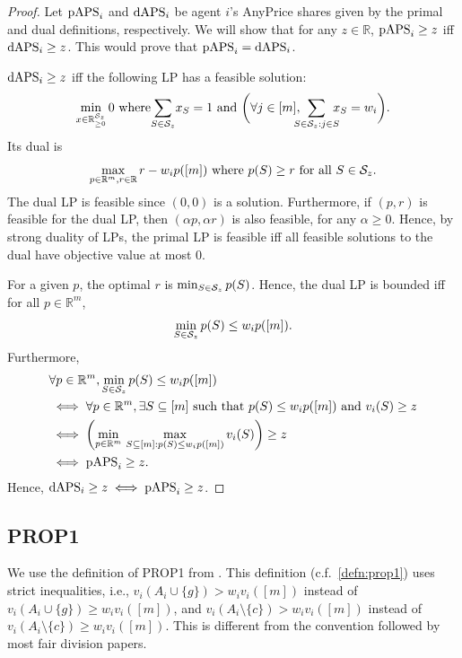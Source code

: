 \begin{proof}
Let $\mathrm{pAPS}_i$ and $\mathrm{dAPS}_i$ be agent $i$'s AnyPrice shares given by
the primal and dual definitions, respectively.
We will show that for any $z \in \mathbb{R}$, $\mathrm{pAPS}_i \ge z$ iff $\mathrm{dAPS}_i \ge z$.
This would prove that $\mathrm{pAPS}_i = \mathrm{dAPS}_i$.

$\mathrm{dAPS}_i \ge z$ iff the following LP has a feasible solution:
\[ \min_{x \in \mathbb{R}_{\ge 0}^{\Scal_z}} 0
\textrm{ where} \!\sum_{S \in \Scal_z} \!x_S = 1
    \textrm{ and } \bigg(\forall j \in [m], \!\!\!\!\sum_{S \in \Scal_z: j \in S} \!\!\!\!x_S = w_i\bigg). \]
Its dual is
\[ \max_{p \in \mathbb{R}^m, r \in \mathbb{R}} r - w_ip([m])
\textrm{ where } p(S) \ge r \textrm{ for all } S \in \mathcal{S}_z. \]
The dual LP is feasible since $(0, 0)$ is a solution.
Furthermore, if $(p, r)$ is feasible for the dual LP,
then $(\alpha p, \alpha r)$ is also feasible, for any $\alpha \ge 0$.
Hence, by strong duality of LPs, the primal LP is feasible iff
all feasible solutions to the dual have objective value at most 0.

For a given $p$, the optimal $r$ is $\min_{S \in \mathcal{S}_z} p(S)$.
Hence, the dual LP is bounded iff for all $p \in \mathbb{R}^m$,
\[ \min_{S \in \mathcal{S}_z} p(S) \le w_ip([m]). \]
Furthermore,
\ifColsTwo\providecommand{\tempWrap}{\\ &\qquad\qquad}\else\let\tempWrap\relax\fi
\begin{align*}
& \forall p \in \mathbb{R}^m, \min_{S \in \Scal_z} p(S) \le w_ip([m])
\\ &\iff \forall p \in \mathbb{R}^m, \exists S \subseteq [m] \textrm{ such that }
    \tempWrap p(S) \le w_ip([m]) \textrm{ and } v_i(S) \ge z
\\ &\iff \left(\min_{p \in \mathbb{R}^m} \,\max_{S \subseteq [m]: p(S) \le w_ip([m])} v_i(S)\right) \ge z
\\ &\iff \pAPS_i \ge z.
\end{align*}
Hence, $\mathrm{dAPS}_i \ge z \iff \mathrm{pAPS}_i \ge z$.
\end{proof}

\subsection{PROP1}
\label{sec:notions:prop1}

We use the definition of PROP1 from \citet{feige2025low}.
This definition (c.f.~\cref{defn:prop1}) uses strict inequalities, i.e.,
$v_i(A_i \cup \{g\}) > w_iv_i([m])$ instead of $v_i(A_i \cup \{g\}) \ge w_iv_i([m])$,
and $v_i(A_i \setminus \{c\}) > w_iv_i([m])$ instead of $v_i(A_i \setminus \{c\}) \ge w_iv_i([m])$.
This is different from the convention followed by most fair division papers.

